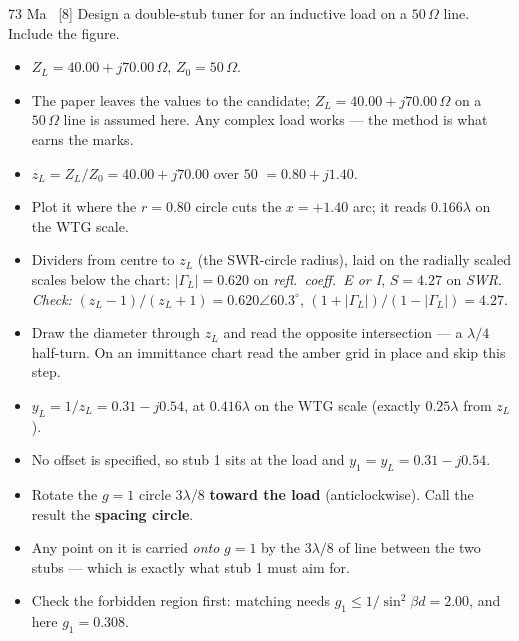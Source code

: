 \begin{asked}{73 Ma \ [8]}
Design a double-stub tuner for an inductive load on a $50\,\Omega$ line. Include the figure.
\end{asked}
\begin{itemize}
  \item $Z_L = 40.00 + j70.00\,\Omega$, $Z_0 = 50\,\Omega$.
  \item \added{} The paper leaves the values to the candidate; $Z_L = 40.00 + j70.00\,\Omega$ on a $50\,\Omega$ line is assumed here. Any complex load works --- the method is what earns the marks.
\end{itemize}
\begin{itemize}
  \item $z_L = Z_L/Z_0 = 40.00 + j70.00$ over $50$ $=0.80 + j1.40$.
  \item Plot it where the $r = 0.80$ circle cuts the $x = +1.40$ arc; it reads $0.166\lambda$ on the WTG scale.
  \item Dividers from centre to $z_L$ (the SWR-circle radius), laid on the radially scaled scales below the chart: $|\Gamma_L| = 0.620$ on \emph{refl.\ coeff.\ E or I}, $S = 4.27$ on \emph{SWR}. \textit{Check:} $(z_L-1)/(z_L+1) = 0.620\angle 60.3^\circ$, $(1+|\Gamma_L|)/(1-|\Gamma_L|) = 4.27$.
\end{itemize}
\begin{itemize}
  \item Draw the diameter through $z_L$ and read the opposite intersection --- a $\lambda/4$ half-turn. On an immittance chart read the amber grid in place and skip this step.
  \item $y_L = 1/z_L = 0.31 - j0.54$, at $0.416\lambda$ on the WTG scale (exactly $0.25\lambda$ from $z_L$).
\end{itemize}
\begin{itemize}
  \item No offset is specified, so stub 1 sits at the load and $y_1 = y_L = 0.31 - j0.54$.
\end{itemize}
\begin{itemize}
  \item Rotate the $g=1$ circle $3\lambda/8$ \textbf{toward the load} (anticlockwise). Call the result the \textbf{spacing circle}.
  \item Any point on it is carried \emph{onto} $g=1$ by the $3\lambda/8$ of line between the two stubs --- which is exactly what stub 1 must aim for.
  \item Check the forbidden region first: matching needs $g_1 \le 1/\sin^2\beta d = 2.00$, and here $g_1 = 0.308$. \checkmark
\end{itemize}
